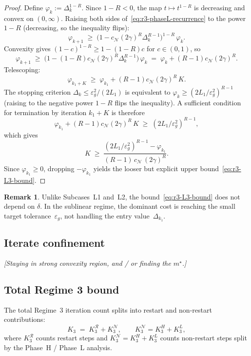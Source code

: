 \documentclass[11pt,a4paper]{article}
\theoremstyle{plain}
\theoremstyle{definition}
\newtheorem{remark}{Remark}
\newcommand{\eps}{\varepsilon}
\newcommand{\epsg}{\eps_{g}}
\newcommand{\Lone}{L_{1}}
\newcommand{\setN}{\mathcal{N}}
\newcommand{\setR}{\mathcal{R}}
\newcommand{\cN}{c_{\setN}}
\begin{document}
\begin{proof}
Define $\varphi_{k} := \Delta_{k}^{1-R}$. Since $1-R < 0$, the map $t \mapsto t^{1-R}$ is decreasing and convex on $(0,\infty)$. Raising both sides of~\eqref{eq:r3-phaseL-recurrence} to the power $1-R$ (decreasing, so the inequality flips):
\[
\varphi_{k+1} \;\geq\; \bigl(1 - \cN(2\gamma)^{R}\Delta_{k}^{R-1}\bigr)^{1-R}\,\varphi_{k}.
\]
Convexity gives $(1-c)^{1-R} \geq 1 - (1-R)c$ for $c \in (0,1)$, so
\[
\varphi_{k+1} \;\geq\; \bigl(1 - (1-R)\cN(2\gamma)^{R}\Delta_{k}^{R-1}\bigr)\,\varphi_{k} \;=\; \varphi_{k} + (R-1)\cN(2\gamma)^{R}.
\]
Telescoping:
\[
\varphi_{k_{1}+K} \;\geq\; \varphi_{k_{1}} + (R-1)\cN(2\gamma)^{R}\,K.
\]
The stopping criterion $\Delta_{k} \leq \epsg^{2}/(2\Lone)$ is equivalent to $\varphi_{k} \geq (2\Lone/\epsg^{2})^{R-1}$ (raising to the negative power $1-R$ flips the inequality). A sufficient condition for termination by iteration $k_{1}+K$ is therefore
\[
\varphi_{k_{1}} + (R-1)\cN(2\gamma)^{R}\,K \;\geq\; (2\Lone/\epsg^{2})^{R-1},
\]
which gives
\[
K \;\geq\; \frac{(2\Lone/\epsg^{2})^{R-1} - \varphi_{k_{1}}}{(R-1)\,\cN\,(2\gamma)^{R}}.
\]
Since $\varphi_{k_{1}} \geq 0$, dropping $-\varphi_{k_{1}}$ yields the looser but explicit upper bound~\eqref{eq:r3-L3-bound}.
\end{proof}

\begin{remark}\label{rem:r3-L3-no-delta}
Unlike Subcases~L1 and~L2, the bound~\eqref{eq:r3-L3-bound} does not depend on $\delta$. In the sublinear regime, the dominant cost is reaching the small target tolerance~$\epsg$, not handling the entry value~$\Delta_{k_{1}}$.
\end{remark}

\subsection{Iterate confinement}\label{subsec:r3-confinement}
\textit{[Staying in strong convexity region, and / or finding the $m^\star$.]}

\subsection{Total Regime 3 bound}\label{subsec:r3-total}

The total Regime~3 iteration count splits into restart and non-restart contributions:
\[
K_{3} \;=\; K_{3}^{\setR} + K_{3}^{\setN}, \qquad K_{3}^{\setN} = K_{3}^{H} + K_{3}^{L},
\]
where $K_{3}^{\setR}$ counts restart steps and $K_{3}^{\setN} = K_3^H + K_3^L$ counts non-restart steps split by the Phase~H / Phase~L analysis.
\end{document}
